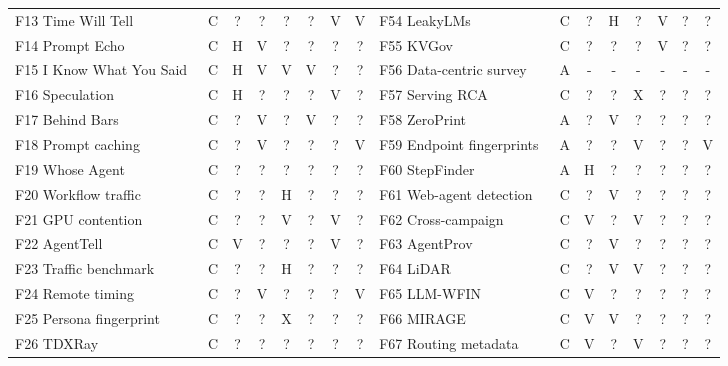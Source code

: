 \begin{table}[t]
\begin{tabularx}{\textwidth}{@{}Yccccccc@{\hspace{9pt}}Yccccccc@{}}
F13 Time Will Tell~\cite{timewilltell2024} & C & ? & ? & ? & ? & V & V & F54 LeakyLMs~\cite{majidi2026leakylms} & C & ? & H & ? & V & ? & ?\\
F14 Prompt Echo~\cite{prompt_echo2026} & C & H & V & ? & ? & ? & ? & F55 KVGov~\cite{addagada2026kvgov} & C & ? & ? & ? & V & ? & ?\\
F15 I Know What You Said~\cite{gao2025iknow} & C & H & V & V & V & ? & ? & F56 Data-centric survey~\cite{lahjouji2026datacentric} & A & - & - & - & - & - & -\\
F16 Speculation~\cite{wei2024speculation} & C & H & ? & ? & ? & V & ? & F57 Serving RCA~\cite{scheinert2026rca} & C & ? & ? & X & ? & ? & ?\\
F17 Behind Bars~\cite{gu2026behindbars} & C & ? & V & ? & V & ? & ? & F58 ZeroPrint~\cite{shao2026zeroprint} & A & ? & V & ? & ? & ? & ?\\
F18 Prompt caching~\cite{gu2025promptcaching} & C & ? & V & ? & ? & ? & V & F59 Endpoint fingerprints~\cite{leshin2026endpoint} & A & ? & ? & V & ? & ? & V\\
F19 Whose Agent~\cite{kang2026whoseagent} & C & ? & ? & ? & ? & ? & ? & F60 StepFinder~\cite{zhu2026stepfinder} & A & H & ? & ? & ? & ? & ?\\
F20 Workflow traffic~\cite{dangol2026workflow} & C & ? & ? & H & ? & ? & ? & F61 Web-agent detection~\cite{fayolle2026webagents} & C & ? & V & ? & ? & ? & ?\\
F21 GPU contention~\cite{abubakar2026contention} & C & ? & ? & V & ? & V & ? & F62 Cross-campaign~\cite{park2026crosscampaign} & C & V & ? & V & ? & ? & ?\\
F22 AgentTell~\cite{shahriar2026agenttell} & C & V & ? & ? & ? & V & ? & F63 AgentProv~\cite{wang2026agentprov} & C & ? & V & ? & ? & ? & ?\\
F23 Traffic benchmark~\cite{pouryousef2026traffic} & C & ? & ? & H & ? & ? & ? & F64 LiDAR~\cite{wang2026lidar} & C & ? & V & V & ? & ? & ?\\
F24 Remote timing~\cite{carlini2024remote} & C & ? & V & ? & ? & ? & V & F65 LLM-WFIN~\cite{jiao2025llmwfin} & C & V & ? & ? & ? & ? & ?\\
F25 Persona fingerprint~\cite{song2026personafingerprint} & C & ? & ? & X & ? & ? & ? & F66 MIRAGE~\cite{revankar2026mirage} & C & V & V & ? & ? & ? & ?\\
F26 TDXRay~\cite{hornetz2026tdxray} & C & ? & ? & ? & ? & ? & ? & F67 Routing metadata~\cite{chen2026routingmetadata} & C & V & ? & V & ? & ? & ?\\

\end{tabularx}
\end{table}
